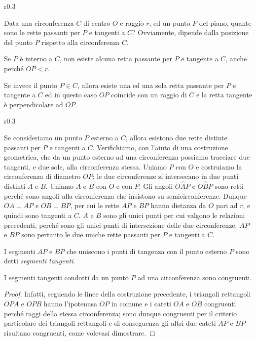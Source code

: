 \begin{wrapfigure}{r}{0.3\textwidth}
	\centering
\end{wrapfigure}
Data una circonferenza $C$ di centro $O$ e raggio $r$, ed un punto $P$ del piano, quante sono le rette passanti per $P$ e tangenti a $C$?  Ovviamente, dipende dalla posizione del punto $P$ rispetto alla circonferenza $C$.

Se $P$ è interno a $C$, non esiste alcuna retta passante per $P$ e tangente a $C$, anche perché $OP < r$.

Se invece il punto $P\in C$, allora esiste una ed una sola retta passante per $P$ e tangente a $C$ ed in questo caso $OP$ coincide con un raggio di $C$ e la retta tangente è perpendicolare ad $OP$.

\begin{wrapfigure}{r}{0.3\textwidth}
	\centering
\end{wrapfigure}
Se consideriamo un punto $P$ esterno a $C$, allora esistono due rette distinte passanti per $P$ e tangenti a $C$. Verifichiamo, con l'aiuto di una costruzione geometrica, che da un punto esterno ad una circonferenza possiamo tracciare due tangenti, e due sole, alla circonferenza stessa.
Uniamo $P$ con $O$ e costruiamo la circonferenza di diametro $OP$; le due circonferenze si intersecano in due punti distinti $A$ e $B$. Uniamo $A$ e $B$ con $O$ e con $P$. Gli angoli $O\widehat{A}P$ e $O\widehat{B}P$ sono retti perché sono angoli alla circonferenza che insistono su semicirconferenze. Dunque $OA\perp AP$ e $OB\perp BP$, per cui le rette $AP$ e $BP$ hanno distanza da $O$ pari ad $r$, e quindi sono tangenti a $C$. $A$ e $B$ sono gli unici punti per cui valgono le relazioni precedenti, perché sono gli unici punti di intersezione delle due circonferenze. $AP$ e $BP$ sono pertanto le due uniche rette passanti per $P$ e tangenti a $C$.

I segmenti $AP$ e $BP$ che uniscono i punti di tangenza con il punto esterno $P$ sono detti \emph{segmenti tangenti}.

\begin{teorema}
I segmenti tangenti condotti da un punto $P$ ad una circonferenza sono congruenti.
\end{teorema}

\begin{proof}
Infatti, seguendo le linee della costruzione precedente, i triangoli rettangoli $OPA$ e $OPB$ hanno l'ipotenusa $OP$ in comune e i cateti $OA$ e $OB$ congruenti perché raggi della stessa circonferenza; sono dunque congruenti per il criterio particolare dei triangoli rettangoli e di conseguenza gli altri due cateti $AP$ e $BP$ risultano congruenti, come volevasi dimostrare.
\end{proof}

